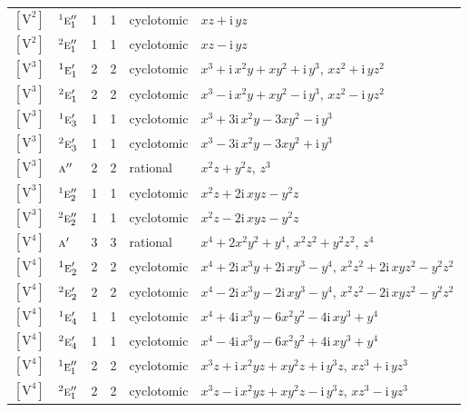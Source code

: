 \documentclass[10pt,a4paper]{article}
\numberwithin{equation}{section}
\newcommand{\irr}[1]{\text{\normalfont\scshape #1}}
\newcommand{\conjpair}[1]{{}^{#1}}
\newcommand{\iunit}{\mathrm{i}}
\newcommand{\jahn}[1]{\mathrm{#1}}
\newlength{\fillwidth}\newlength{\cellwidth}\newlength{\colwidth}
\begin{document}
{\begin{longtable}{@{}llrrl>{\RaggedRight\arraybackslash}p{\fillwidth}@{}}
$\jahn{[V^{2}]}$ & $\conjpair{1}\irr{e}_{1}''$ & 1 & 1 & cyclotomic & $xz + \iunit{}\,yz$\\
$\jahn{[V^{2}]}$ & $\conjpair{2}\irr{e}_{1}''$ & 1 & 1 & cyclotomic & $xz - \iunit{}\,yz$\\
$\jahn{[V^{3}]}$ & $\conjpair{1}\irr{e}_{1}'$ & 2 & 2 & cyclotomic & $x^{3} + \iunit{}\,x^{2}y + xy^{2} + \iunit{}\,y^{3}$, $xz^{2} + \iunit{}\,yz^{2}$\\
$\jahn{[V^{3}]}$ & $\conjpair{2}\irr{e}_{1}'$ & 2 & 2 & cyclotomic & $x^{3} - \iunit{}\,x^{2}y + xy^{2} - \iunit{}\,y^{3}$, $xz^{2} - \iunit{}\,yz^{2}$\\
$\jahn{[V^{3}]}$ & $\conjpair{1}\irr{e}_{3}'$ & 1 & 1 & cyclotomic & $x^{3} + 3\iunit{}\,x^{2}y - 3xy^{2} - \iunit{}\,y^{3}$\\
$\jahn{[V^{3}]}$ & $\conjpair{2}\irr{e}_{3}'$ & 1 & 1 & cyclotomic & $x^{3} - 3\iunit{}\,x^{2}y - 3xy^{2} + \iunit{}\,y^{3}$\\
$\jahn{[V^{3}]}$ & $\irr{a}''$ & 2 & 2 & rational & $x^{2}z + y^{2}z$, $z^{3}$\\
$\jahn{[V^{3}]}$ & $\conjpair{1}\irr{e}_{2}''$ & 1 & 1 & cyclotomic & $x^{2}z + 2\iunit{}\,xyz - y^{2}z$\\
$\jahn{[V^{3}]}$ & $\conjpair{2}\irr{e}_{2}''$ & 1 & 1 & cyclotomic & $x^{2}z - 2\iunit{}\,xyz - y^{2}z$\\
$\jahn{[V^{4}]}$ & $\irr{a}'$ & 3 & 3 & rational & $x^{4} + 2x^{2}y^{2} + y^{4}$, $x^{2}z^{2} + y^{2}z^{2}$, $z^{4}$\\
$\jahn{[V^{4}]}$ & $\conjpair{1}\irr{e}_{2}'$ & 2 & 2 & cyclotomic & $x^{4} + 2\iunit{}\,x^{3}y + 2\iunit{}\,xy^{3} - y^{4}$, $x^{2}z^{2} + 2\iunit{}\,xyz^{2} - y^{2}z^{2}$\\
$\jahn{[V^{4}]}$ & $\conjpair{2}\irr{e}_{2}'$ & 2 & 2 & cyclotomic & $x^{4} - 2\iunit{}\,x^{3}y - 2\iunit{}\,xy^{3} - y^{4}$, $x^{2}z^{2} - 2\iunit{}\,xyz^{2} - y^{2}z^{2}$\\
$\jahn{[V^{4}]}$ & $\conjpair{1}\irr{e}_{4}'$ & 1 & 1 & cyclotomic & $x^{4} + 4\iunit{}\,x^{3}y - 6x^{2}y^{2} - 4\iunit{}\,xy^{3} + y^{4}$\\
$\jahn{[V^{4}]}$ & $\conjpair{2}\irr{e}_{4}'$ & 1 & 1 & cyclotomic & $x^{4} - 4\iunit{}\,x^{3}y - 6x^{2}y^{2} + 4\iunit{}\,xy^{3} + y^{4}$\\
$\jahn{[V^{4}]}$ & $\conjpair{1}\irr{e}_{1}''$ & 2 & 2 & cyclotomic & $x^{3}z + \iunit{}\,x^{2}yz + xy^{2}z + \iunit{}\,y^{3}z$, $xz^{3} + \iunit{}\,yz^{3}$\\
$\jahn{[V^{4}]}$ & $\conjpair{2}\irr{e}_{1}''$ & 2 & 2 & cyclotomic & $x^{3}z - \iunit{}\,x^{2}yz + xy^{2}z - \iunit{}\,y^{3}z$, $xz^{3} - \iunit{}\,yz^{3}$\\

\end{longtable}}
\end{document}
